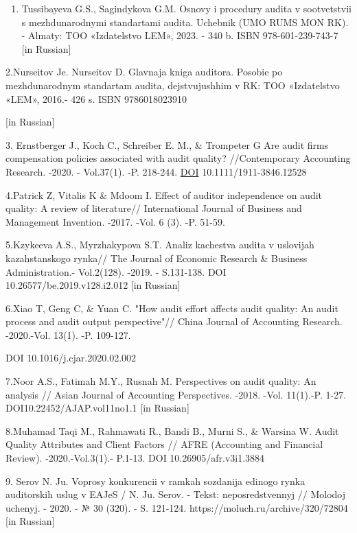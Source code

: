   \begin{references}

\begin{enumerate}
\def\labelenumi{\arabic{enumi}.}
\item
  Tussibayeva G.S., Sagindykova G.M. Osnovy i procedury audita v
  sootvetstvii s mezhdunarodnymi standartami audita. Uchebnik (UMO RUMS
  MON RK). - Almaty: TOO «Izdatel\textquotesingle stvo LEM», 2023. - 340
  b. ISBN 978-601-239-743-7 {[}in Russian{]}
\end{enumerate}

2.Nurseitov Je. Nurseitov D. Glavnaja kniga auditora. Posobie po
mezhdunarodnym standartam audita, dejstvujushhim v RK: TOO
«Izdatel\textquotesingle stvo «LEM», 2016.- 426 s. ISBN 9786018023910

{[}in Russian{]}

3. Ernstberger J., Koch C., Schreiber E. M., \& Trompeter G Are audit
firms\textquotesingle{} compensation policies associated with audit
quality? //Contemporary Accounting Research. -2020. - Vol.37(1). -P.
218-244. \href{https://DOI/}{DOI} 10.1111/1911-3846.12528

4.Patrick Z, Vitalis K \& Mdoom I. Effect of auditor independence on
audit quality: A review of literature// International Journal of
Business and Management Invention. -2017. -Vol. 6 (3). -P. 51-59.

5.Kzykeeva A.S., Myrzhakypova S.T. Analiz kachestva audita v uslovijah
kazahstanskogo rynka// The Journal of Economic Research \& Business
Administration.- Vol.2(128). -2019. - S.131-138. DOI
10.26577/be.2019.v128.i2.012 {[}in Russian{]}

6.Xiao T, Geng C, \& Yuan C. "How audit effort affects audit quality: An
audit process and audit output perspective"// China Journal of
Accounting Research. -2020.-Vol. 13(1). -P. 109-127.

DOI 10.1016/j.cjar.2020.02.002

7.Noor A.S., Fatimah M.Y., Rusnah M. Perspectives on audit quality: An
analysis // Asian Journal of Accounting Perspectives. -2018. -Vol.
11(1).-P. 1-27. DOI10.22452/AJAP.vol11no1.1 {[}in Russian{]}

8.Muhamad Taqi M., Rahmawati R., Bandi B., Murni S., \& Warsina W. Audit
Quality Attributes and Client Factors // AFRE (Accounting and Financial
Review). -2020.-Vol.3(1).- P.1-13. DOI 10.26905/afr.v3i1.3884

9. Serov N. Ju. Voprosy konkurencii v ramkah sozdanija edinogo rynka
auditorskih uslug v EAJeS / N. Ju. Serov. - Tekst: neposredstvennyj //
Molodoj uchenyj. - 2020. - № 30 (320). - S. 121-124.
https://moluch.ru/archive/320/72804 {[}in Russian{]}


\end{references}

